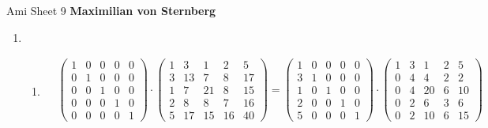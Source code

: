 \documentclass[]{book}
\theoremstyle{definition}
\begin{document}
\begin{center}
{\Large Ami \hspace{0.5cm} Sheet 9}
\textbf{Maximilian von Sternberg} %
\end{center}

\vspace{0.2 cm}

\begin{enumerate}
    \item \begin{enumerate}
        \item \begin{align*}
            &
            \begin{pmatrix}
                1 & 0 & 0 & 0 & 0 \\
                0 & 1 & 0 & 0 & 0 \\
                0 & 0 & 1 & 0 & 0 \\
                0 & 0 & 0 & 1 & 0 \\
                0 & 0 & 0 & 0 & 1 
            \end{pmatrix}
            \cdot
            \begin{pmatrix}
                1 & 3 & 1 & 2 & 5 \\
                3 & 13 & 7 & 8 & 17 \\
                1 & 7 & 21 & 8 & 15 \\
                2 & 8 & 8 & 7 & 16 \\
                5 & 17 & 15 & 16 & 40 
            \end{pmatrix}
            =
            \begin{pmatrix}
                1 & 0 & 0 & 0 & 0 \\
                3 & 1 & 0 & 0 & 0 \\
                1 & 0 & 1 & 0 & 0 \\
                2 & 0 & 0 & 1 & 0 \\
                5 & 0 & 0 & 0 & 1 
            \end{pmatrix} 
            \cdot
            \begin{pmatrix}
                1 & 3 & 1 & 2 & 5 \\
                0 & 4 & 4 & 2 & 2 \\
                0 & 4 & 20 & 6 & 10 \\
                0 & 2 & 6 & 3 & 6 \\
                0 & 2 & 10 & 6 & 15 
            \end{pmatrix} \\

\end{align*}
\end{enumerate}
\end{enumerate}
\end{document}
